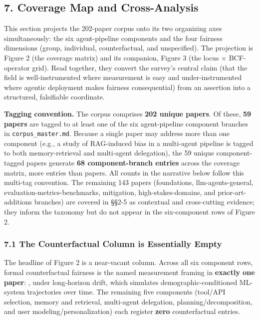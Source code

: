 \documentclass[10pt]{article}
\begin{document}
\subsection*{7. Coverage Map and Cross-Analysis}

This section projects the 202-paper corpus onto its two organizing axes simultaneously: the six agent-pipeline components and the four fairness dimensions (group, individual, counterfactual, and unspecified). The projection is Figure 2 (the coverage matrix) and its companion, Figure 3 (the locus $\times$ BCF-operator grid). Read together, they convert the survey's central claim (that the field is well-instrumented where measurement is easy and under-instrumented where agentic deployment makes fairness consequential) from an assertion into a structured, falsifiable coordinate.

\textbf{Tagging convention.} The corpus comprises \textbf{202 unique papers}. Of these, \textbf{59 papers} are tagged to at least one of the six agent-pipeline component branches in \texttt{corpus\_master.md}. Because a single paper may address more than one component (e.g., a study of RAG-induced bias in a multi-agent pipeline is tagged to both memory-retrieval and multi-agent delegation), the 59 unique component-tagged papers generate \textbf{68 component-branch entries} across the coverage matrix, more entries than papers. All counts in the narrative below follow this multi-tag convention. The remaining 143 papers (foundations, llm-agents-general, evaluation-metrics-benchmarks, mitigation, high-stakes-domains, and prior-art-additions branches) are covered in \S{}\S{}2-5 as contextual and cross-cutting evidence; they inform the taxonomy but do not appear in the six-component rows of Figure 2.

\subsubsection*{7.1 The Counterfactual Column is Essentially Empty}

The headline of Figure 2 is a near-vacant column. Across all six component rows, formal counterfactual fairness is the named measurement framing in \textbf{exactly one paper}: \cite{she2025fairsense}, under long-horizon drift, which simulates demographic-conditioned ML-system trajectories over time. The remaining five components (tool/API selection, memory and retrieval, multi-agent delegation, planning/decomposition, and user modeling/personalization) each register \textbf{zero} counterfactual entries.
\end{document}
